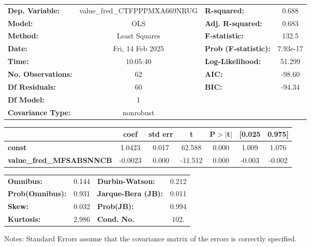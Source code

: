 \begin{center}
\begin{tabular}{lclc}
\toprule
\textbf{Dep. Variable:}          & value\_fred\_CTFPPPMXA669NRUG & \textbf{  R-squared:         } &     0.688   \\
\textbf{Model:}                  &              OLS              & \textbf{  Adj. R-squared:    } &     0.683   \\
\textbf{Method:}                 &         Least Squares         & \textbf{  F-statistic:       } &     132.5   \\
\textbf{Date:}                   &        Fri, 14 Feb 2025       & \textbf{  Prob (F-statistic):} &  7.93e-17   \\
\textbf{Time:}                   &            10:05:40           & \textbf{  Log-Likelihood:    } &    51.299   \\
\textbf{No. Observations:}       &                 62            & \textbf{  AIC:               } &    -98.60   \\
\textbf{Df Residuals:}           &                 60            & \textbf{  BIC:               } &    -94.34   \\
\textbf{Df Model:}               &                  1            & \textbf{                     } &             \\
\textbf{Covariance Type:}        &           nonrobust           & \textbf{                     } &             \\
\bottomrule
\end{tabular}
\begin{tabular}{lcccccc}
                                 & \textbf{coef} & \textbf{std err} & \textbf{t} & \textbf{P$> |$t$|$} & \textbf{[0.025} & \textbf{0.975]}  \\
\midrule
\textbf{const}                   &       1.0423  &        0.017     &    62.588  &         0.000        &        1.009    &        1.076     \\
\textbf{value\_fred\_MFSABSNNCB} &      -0.0023  &        0.000     &   -11.512  &         0.000        &       -0.003    &       -0.002     \\
\bottomrule
\end{tabular}
\begin{tabular}{lclc}
\textbf{Omnibus:}       &  0.144 & \textbf{  Durbin-Watson:     } &    0.212  \\
\textbf{Prob(Omnibus):} &  0.931 & \textbf{  Jarque-Bera (JB):  } &    0.011  \\
\textbf{Skew:}          &  0.032 & \textbf{  Prob(JB):          } &    0.994  \\
\textbf{Kurtosis:}      &  2.986 & \textbf{  Cond. No.          } &     102.  \\
\bottomrule
\end{tabular}
\end{center}

Notes: \newline
 [1] Standard Errors assume that the covariance matrix of the errors is correctly specified.